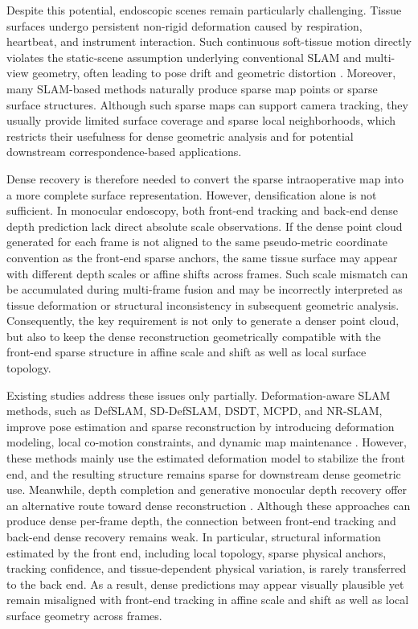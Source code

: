 \documentclass[pdflatex,sn-mathphys-num]{sn-jnl}
\begin{document}
Despite this potential, endoscopic scenes remain particularly challenging. Tissue surfaces undergo persistent non-rigid deformation caused by respiration, heartbeat, and instrument interaction. Such continuous soft-tissue motion directly violates the static-scene assumption underlying conventional SLAM and multi-view geometry, often leading to pose drift and geometric distortion \cite{bib1,bib3,bib4}. Moreover, many SLAM-based methods naturally produce sparse map points or sparse surface structures. Although such sparse maps can support camera tracking, they usually provide limited surface coverage and sparse local neighborhoods, which restricts their usefulness for dense geometric analysis and for potential downstream correspondence-based applications.

Dense recovery is therefore needed to convert the sparse intraoperative map into a more complete surface representation. However, densification alone is not sufficient. In monocular endoscopy, both front-end tracking and back-end dense depth prediction lack direct absolute scale observations. If the dense point cloud generated for each frame is not aligned to the same pseudo-metric coordinate convention as the front-end sparse anchors, the same tissue surface may appear with different depth scales or affine shifts across frames. Such scale mismatch can be accumulated during multi-frame fusion and may be incorrectly interpreted as tissue deformation or structural inconsistency in subsequent geometric analysis. Consequently, the key requirement is not only to generate a denser point cloud, but also to keep the dense reconstruction geometrically compatible with the front-end sparse structure in affine scale and shift as well as local surface topology.

Existing studies address these issues only partially. Deformation-aware SLAM methods, such as DefSLAM, SD-DefSLAM, DSDT, MCPD, and NR-SLAM, improve pose estimation and sparse reconstruction by introducing deformation modeling, local co-motion constraints, and dynamic map maintenance \cite{bib5,bib6,bib7,bib8,bib9}. However, these methods mainly use the estimated deformation model to stabilize the front end, and the resulting structure remains sparse for downstream dense geometric use. Meanwhile, depth completion and generative monocular depth recovery offer an alternative route toward dense reconstruction \cite{bib10,bib11,bib12,bib13,bib14,bib15,bib16,bib17,bib18,bib19,bib20,bib21,bib22}. Although these approaches can produce dense per-frame depth, the connection between front-end tracking and back-end dense recovery remains weak. In particular, structural information estimated by the front end, including local topology, sparse physical anchors, tracking confidence, and tissue-dependent physical variation, is rarely transferred to the back end. As a result, dense predictions may appear visually plausible yet remain misaligned with front-end tracking in affine scale and shift as well as local surface geometry across frames.
\end{document}
